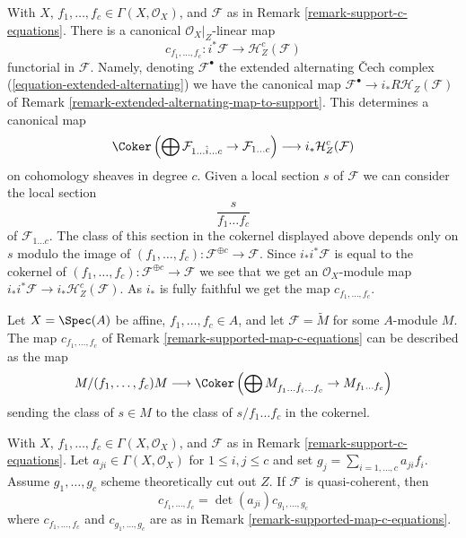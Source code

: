 \begin{remark}
\label{remark-supported-map-c-equations}
With $X$, $f_1, \ldots, f_c \in \Gamma(X, \mathcal{O}_X)$, and
$\mathcal{F}$ as in Remark \ref{remark-support-c-equations}.
There is a canonical $\mathcal{O}_X|_Z$-linear map
$$
c_{f_1, \ldots, f_c} :
i^*\mathcal{F}
\longrightarrow
\mathcal{H}^c_Z(\mathcal{F})
$$
functorial in $\mathcal{F}$. Namely, denoting $\mathcal{F}^\bullet$ the
extended alternating {\v C}ech complex (\ref{equation-extended-alternating})
we have the canonical map
$\mathcal{F}^\bullet \to i_*R\mathcal{H}_Z(\mathcal{F})$
of Remark \ref{remark-extended-alternating-map-to-support}.
This determines a canonical map
$$
\Coker\left(\bigoplus \mathcal{F}_{1 \ldots \hat i \ldots c} \to
\mathcal{F}_{1 \ldots c}\right)
\longrightarrow
i_*\mathcal{H}^c_Z(\mathcal{F})
$$
on cohomology sheaves in degree $c$.
Given a local section $s$ of $\mathcal{F}$ we can consider the
local section
$$
\frac{s}{f_1 \ldots f_c}
$$
of $\mathcal{F}_{1 \ldots c}$. The class of this section in the cokernel
displayed above depends only on $s$ modulo the image of
$(f_1, \ldots, f_c) : \mathcal{F}^{\oplus c} \to \mathcal{F}$.
Since $i_*i^*\mathcal{F}$ is equal to the cokernel of
$(f_1, \ldots, f_c) : \mathcal{F}^{\oplus c} \to \mathcal{F}$
we see that we get an $\mathcal{O}_X$-module map
$i_*i^*\mathcal{F} \to i_*\mathcal{H}_Z^c(\mathcal{F})$.
As $i_*$ is fully faithful we get the map $c_{f_1, \ldots, f_c}$.
\end{remark}

\begin{example}
\label{example-affine-supported-map-c-equations}
Let $X = \Spec(A)$ be affine, $f_1, \ldots, f_c \in A$, and let
$\mathcal{F} = \widetilde{M}$ for some $A$-module $M$. The map
$c_{f_1, \ldots, f_c}$ of Remark \ref{remark-supported-map-c-equations}
can be described as the map
$$
M/(f_1, \ldots, f_c)M
\longrightarrow
\Coker\left(
\bigoplus M_{f_1 \ldots \hat f_i \ldots f_c} \to M_{f_1 \ldots f_c}
\right)
$$
sending the class of $s \in M$ to the class of $s/f_1 \ldots f_c$
in the cokernel.
\end{example}

\begin{lemma}
\label{lemma-supported-map-determinant}
With $X$, $f_1, \ldots, f_c \in \Gamma(X, \mathcal{O}_X)$, and
$\mathcal{F}$ as in Remark \ref{remark-support-c-equations}.
Let $a_{ji} \in \Gamma(X, \mathcal{O}_X)$ for $1 \leq i, j \leq c$
and set $g_j = \sum_{i = 1, \ldots, c} a_{ji}f_i$. Assume $g_1, \ldots, g_c$
scheme theoretically cut out $Z$. If $\mathcal{F}$ is quasi-coherent, then
$$
c_{f_1, \ldots, f_c} = \det(a_{ji}) c_{g_1, \ldots, g_c}
$$
where $c_{f_1, \ldots, f_c}$ and $c_{g_1, \ldots, g_c}$ are as in
Remark \ref{remark-supported-map-c-equations}.
\end{lemma}

